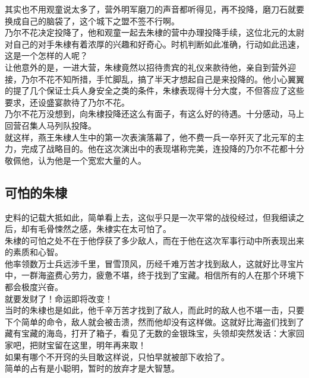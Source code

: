 \begin{multicols}{\theparacolNo}
其实也不用观童说太多了，营外明军磨刀的声音都听得见，再不投降，磨刀石就要换成自己的脑袋了，这个城下之盟不签不行啊。\\

乃尔不花决定投降了，他和观童一起去朱棣的营中办理投降手续，这位北元的太尉对自己的对手朱棣有着浓厚的兴趣和好奇心。时机判断如此准确，行动如此迅速，这是一个怎样的人呢？\\

让他意外的是，一进大营，朱棣竟然以招待贵宾的礼仪来款待他，亲自到营外迎接，乃尔不花不知所措，手忙脚乱，搞了半天才想起自己是来投降的。他小心翼翼的提了几个保证士兵人身安全之类的条件，朱棣表现得十分大度，不但答应了这些要求，还设盛宴款待了乃尔不花。\\

乃尔不花万没想到，向朱棣投降还这么有面子，有这么好的待遇。十分感动，马上回营召集人马列队投降。\\

就这样，燕王朱棣人生中的第一次表演落幕了，他不费一兵一卒歼灭了北元军的主力，完成了战略目的。他在这次演出中的表现堪称完美，连投降的乃尔不花都十分敬佩他，认为他是一个宽宏大量的人。\\

\subsection{可怕的朱棣}
史料的记载大抵如此，简单看上去，这似乎只是一次平常的战役经过，但我细读之后，却有毛骨悚然之感，朱棣实在太可怕了。\\

朱棣的可怕之处不在于他俘获了多少敌人，而在于他在这次军事行动中所表现出来的素质和心智。\\

他率领数万士兵远涉千里，冒雪顶风，历经千难万苦才找到敌人，这就好比寻宝片中，一群海盗费心劳力，疲惫不堪，终于找到了宝藏。相信所有的人在那个环境下都会极度兴奋。\\

就要发财了！命运即将改变！\\

当时的朱棣也是如此，他千辛万苦才找到了敌人，而此时的敌人也不堪一击，只要下个简单的命令，敌人就会被击溃，然而他却没有这样做。这就好比海盗们找到了藏有宝藏的海岛，打开了箱子，看见了无数的金银珠宝，头领却突然发话：大家回家吧，把财宝留在这里，明年再来取！\\

如果有哪个不开窍的头目敢这样说，只怕早就被部下收拾了。\\

简单的占有是小聪明，暂时的放弃才是大智慧。\\


\end{multicols}
